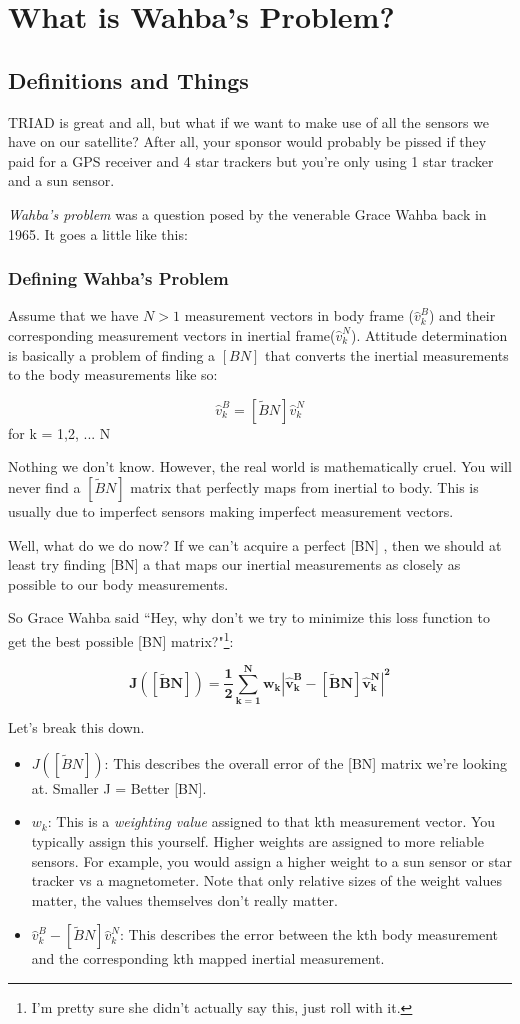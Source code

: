 \documentclass[a4paper,14pt]{extreport}
\begin{document}
\chapter{What is Wahba's Problem?}
\section{Definitions and Things}
TRIAD is great and all, but what if we want to make use of all the sensors we have on our satellite? After all, your sponsor would probably be pissed if they paid for a GPS receiver and 4 star trackers but you're only using 1 star tracker and a sun sensor.

\emph{Wahba's problem} was a question posed by the venerable Grace Wahba back in 1965. It goes a little like this:
\subsection{Defining Wahba's Problem}
Assume that we have $N>1$ measurement vectors in body frame ($\hat{v}_k^B$) and their corresponding measurement vectors in inertial frame($\hat{v}_k^N$). Attitude determination is basically a problem of finding a $[BN]$ that converts the inertial measurements to the body measurements like so:
\begin{center}
\[
\hat{v}_k^B = [\tilde{B}N]\hat{v}_k^N 
\]
for k = 1,2, ... N
\end{center}
Nothing we don't know. However, the real world is mathematically cruel. You will never find a $[\tilde{B}N]$ matrix that perfectly maps from inertial to body. This is usually due to imperfect sensors making imperfect measurement vectors. 

Well, what do we do now? If we can't acquire a perfect [BN] , then we should at least try finding [BN] a that maps our inertial measurements as closely as possible to our body measurements. 

So Grace Wahba said ``Hey, why don't we try to minimize this loss function to get the best possible [BN] matrix?"\footnote{I'm pretty sure she didn't actually say this, just roll with it.}:

\[
\mathbf{
J([\tilde{B}N]) = \dfrac{1}{2} \sum^N_{k=1} w_k |\hat{v}_k^B - [\tilde{B}N]\hat{v}_k^N|^2}
\]

Let's break this down.
\begin{itemize}
\item{$J([\tilde{B}N])$: This describes the overall error of the [BN] matrix we're looking at. Smaller J = Better [BN].}
\item{$w_k$: This is a \emph{weighting value} assigned to that kth measurement vector. You typically assign this yourself. Higher weights are assigned to more reliable sensors. For example, you would assign a higher weight to a sun sensor or star tracker vs a magnetometer. Note that only relative sizes of the weight values matter, the values themselves don't really matter.
}
\item{$\hat{v}_k^B - [\tilde{B}N]\hat{v}_k^N$: This describes the error between the kth body measurement and the corresponding kth mapped inertial measurement.}
\end{itemize}
\end{document}

